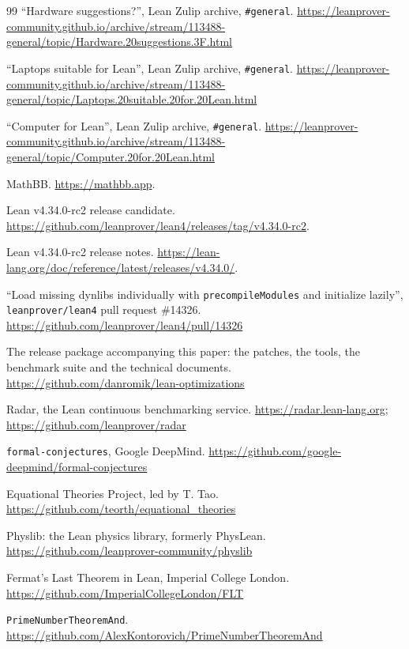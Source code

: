 \documentclass{article}
\begin{document}
\begin{thebibliography}{99}
 ``Hardware suggestions?'', Lean Zulip archive, \texttt{\#general}.
\url{https://leanprover-community.github.io/archive/stream/113488-general/topic/Hardware.20suggestions.3F.html}

 ``Laptops suitable for Lean'', Lean Zulip archive, \texttt{\#general}.
\url{https://leanprover-community.github.io/archive/stream/113488-general/topic/Laptops.20suitable.20for.20Lean.html}

 ``Computer for Lean'', Lean Zulip archive, \texttt{\#general}.
\url{https://leanprover-community.github.io/archive/stream/113488-general/topic/Computer.20for.20Lean.html}

 MathBB.
\url{https://mathbb.app}.

 Lean v4.34.0-rc2 release candidate.
\url{https://github.com/leanprover/lean4/releases/tag/v4.34.0-rc2}.

 Lean v4.34.0-rc2 release notes.
\url{https://lean-lang.org/doc/reference/latest/releases/v4.34.0/}.

 ``Load missing dynlibs individually with \texttt{precompileModules} and initialize lazily'', \texttt{leanprover/lean4} pull request \#14326.
\url{https://github.com/leanprover/lean4/pull/14326}

 The release package accompanying this paper: the patches, the tools, the
benchmark suite and the technical documents.
\url{https://github.com/danromik/lean-optimizations}

 Radar, the Lean continuous benchmarking service.
\url{https://radar.lean-lang.org}; \url{https://github.com/leanprover/radar}

 \texttt{formal-conjectures}, Google DeepMind.
\url{https://github.com/google-deepmind/formal-conjectures}

 Equational Theories Project, led by T. Tao.
\url{https://github.com/teorth/equational_theories}

 Physlib: the Lean physics library, formerly PhysLean.
\url{https://github.com/leanprover-community/physlib}

 Fermat's Last Theorem in Lean, Imperial College London.
\url{https://github.com/ImperialCollegeLondon/FLT}

 \texttt{PrimeNumberTheoremAnd}.
\url{https://github.com/AlexKontorovich/PrimeNumberTheoremAnd}


\end{thebibliography}
\end{document}
